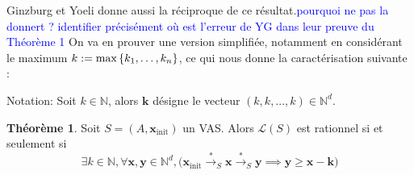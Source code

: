 \documentclass[a4paper,final]{article}
\theoremstyle{definition}
\newtheorem{Theorem}{Théorème}
\let\geq\geqslant
\newcommand{\alain}[1]{\textcolor{blue}{#1}}
\newcommand{\os}[1]{\left\{\mathinner{#1}\right\}}
\newcommand{\N}{\ensuremath{\mathbb{N}}}
\newcommand{\lang}{\ensuremath{\mathcal{L}}}
\newcommand{\conf}{\ensuremath{\mathcal{R}}}
\newcommand{\trans}[2]{\ensuremath{\stackrel{#1}{\longrightarrow}_{#2}}}
\newcommand{\vect}[1]{\ensuremath{\mathbf{#1}}}
\newcommand{\xinit}{\ensuremath{\vect{x}_\text{init}}}
\newcommand{\valeur}[1]{\ensuremath{\overline{#1}}}
\begin{document}
Ginzburg et Yoeli donne aussi la réciproque de ce résultat.\alain{pourquoi ne pas la donnert ?}
\alain{identifier précisément où est l'erreur de YG dans leur preuve du Théorème 1}
On va en prouver une version simplifiée, notamment en considérant le maximum $k:= \text{max}\os{k_1,\dots,k_n}$, ce qui nous donne la caractérisation suivante :




Notation:  Soit $k \in \N$, alors $\vect{k}$ désigne le vecteur $(k,k,...,k)\in\N^d$.

\begin{Theorem}
    Soit $S=(A,\xinit)$ un VAS.
    Alors $\lang(S)$ est rationnel si et seulement si
    \begin{equation}
        \exists k\in\N, \forall \vect{x},\vect{y}\in\N^d, 
\big( \xinit\trans{*}{S} \vect{x} \trans{*}{S} \vect{y}\implies
\vect{y}\geq \vect{x} -\vect{k} \big)
    \label{eq:caracterisation}
    \end{equation}
\end{Theorem}
\end{document}
